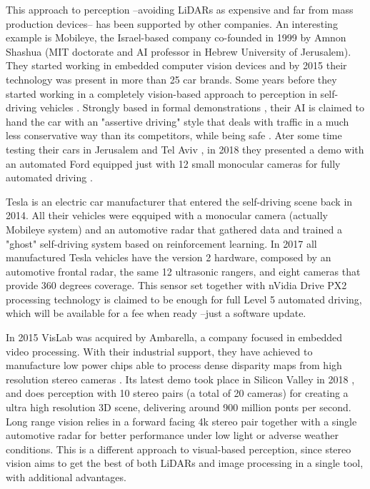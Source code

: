 This approach to perception --avoiding LiDARs as expensive and far from mass
production devices-- has been supported by other companies. An interesting 
example is Mobileye, the Israel-based company co-founded in 1999 by Amnon 
Shashua (MIT doctorate and AI professor in Hebrew University of Jerusalem).
They started working in embedded computer vision devices and by 2015 their 
technology was present in more than 25 car brands. Some years before they
started working in a completely vision-based approach to perception in 
self-driving vehicles \cite{Mobileye2018}. Strongly based in formal 
demonstrations 
\cite{Shalev-Shwartz2017}, their AI is claimed to hand the car with an 
"assertive driving" style that deals with traffic in a much less
conservative way than its competitors, while being safe 
\cite{Shalev-shwartz2016}. 
Ater some time testing their cars in Jerusalem and Tel Aviv
\cite{Edelstein2018}, in 2018 they presented a demo with an automated Ford 
equipped just with 12 small monocular cameras for fully automated driving 
\cite{Scheer2018}.

Tesla is an electric car manufacturer that entered the self-driving scene back
in 2014. All their vehicles were eqquiped with a monocular camera (actually
Mobileye system) and an automotive radar that gathered data and trained a
"ghost" self-driving system based on reinforcement learning. In 2017 all 
manufactured Tesla vehicles have the version 2 hardware, composed by an
automotive frontal radar, the same 12 ultrasonic rangers, and eight cameras 
that provide 360 degrees coverage. This sensor set together with nVidia
Drive PX2 processing technology is claimed to be enough for full Level 5 
automated driving, which will be available for a fee when ready --just a 
software update.

In 2015 VisLab was acquired by Ambarella, a company focused in embedded video
processing. With their industrial support, they have achieved to manufacture
low power chips able to process dense disparity maps from high resolution 
stereo cameras \cite{Ambarella2018}.
Its latest demo took place in Silicon Valley in 2018 \cite{AUVSI2018},
and does perception with 10 stereo pairs (a total of 20 cameras) for creating a
ultra high resolution 3D scene, delivering around 900 million ponts per second.
Long range vision relies in a forward facing 4k stereo pair together with a 
single automotive radar for better performance under low light or adverse
weather conditions. This is a different approach to visual-based perception,
since stereo vision aims to get the best of both LiDARs and image processing in
a single tool, with additional advantages.

